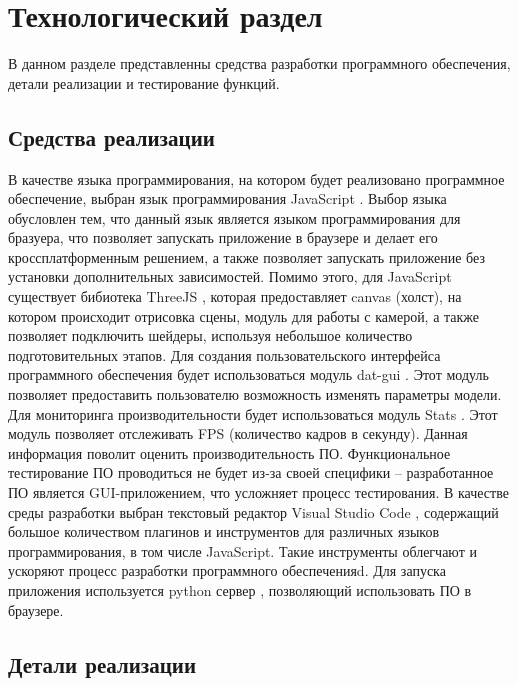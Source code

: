 \chapter{Технологический раздел}
\label{cha:impl}
В данном разделе представленны средства разработки программного обеспечения, детали реализации и тестирование функций.
\section{Средства реализации}
В качестве языка программирования, на котором будет реализовано программное обеспечение, выбран язык программирования JavaScript \cite{impl:js}. Выбор языка обусловлен тем, что данный язык является языком программирования для бразуера,
что позволяет запускать приложение в браузере и делает его кроссплатформенным решением, а также позволяет запускать приложение без установки дополнительных зависимостей. Помимо этого, для JavaScript существует бибиотека 
ThreeJS \cite{impl:three_js}, которая предоставляет canvas (холст), на котором происходит отрисовка сцены, модуль для работы с камерой, а также позволяет подключить шейдеры, используя небольшое количество подготовительных этапов.
Для создания пользовательского интерфейса программного обеспечения будет использоваться модуль dat-gui \cite{impl:dat_gui}. Этот модуль позволяет предоставить пользователю возможность изменять параметры модели.
Для мониторинга производительности будет использоваться модуль Stats \cite{impl:stats_js}. Этот модуль позволяет отслеживать FPS (количество кадров в секунду). Данная информация поволит оценить производительность ПО.
Функциональное тестирование ПО проводиться не будет из-за своей специфики -- разработанное ПО является GUI-приложением, что усложняет процесс тестирования.
В качестве среды разработки выбран текстовый редактор Visual Studio Code \cite{impl:vscode}, содержащий большое количеством плагинов и инструментов для различных языков программирования, в том числе JavaScript. Такие инструменты облегчают и ускоряют процесс разработки программного обеспеченияd.
Для запуска приложения используется python сервер \cite{impl:python}, позволяющий использовать ПО в браузере.  
\section{Детали реализации}


